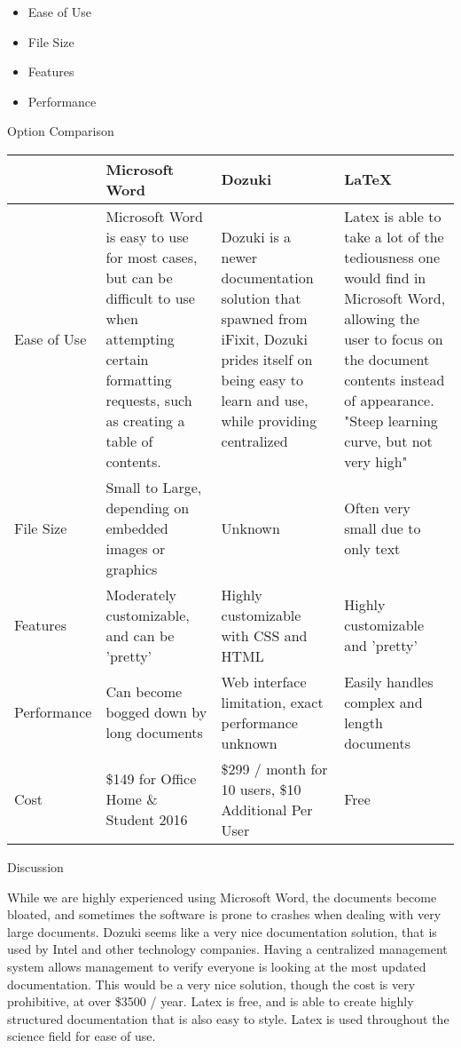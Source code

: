 \documentclass[letterpaper, 10pt, draftclsnofoot, compsoc, onecolumn]{IEEEtran}
\begin{document}
{{\begin{itemize}
\item Ease of Use
\item File Size
\item Features
\item Performance
\end{itemize}

 \par}


\newpage
{\noindent Option Comparison \par}
\tablehead{}
\begin{supertabular}{|p{2cm}|p{4cm}|p{4cm}|p{4cm}|}
\hline  & Microsoft Word & Dozuki & LaTeX\\ \hline
Ease of Use & Microsoft Word is easy to use for most cases, but can be difficult to use when attempting certain formatting requests, such as creating a table of contents. & Dozuki is a newer documentation solution that spawned from iFixit, Dozuki prides itself on being easy to learn and use, while providing centralized   & Latex is able to take a lot of the tediousness one would find in Microsoft Word, allowing the user to focus on the document contents instead of appearance. "Steep learning curve, but not very high" \cite{McGrath} \\ \hline
File Size & Small to Large, depending on embedded images or graphics & Unknown & Often very small due to only text \\ \hline
Features & Moderately customizable, and can be 'pretty' & Highly customizable with CSS and HTML & Highly customizable and 'pretty' \\ \hline
Performance & Can become bogged down by long documents & Web interface limitation, exact performance unknown & Easily handles complex and length documents  \\ \hline
Cost & \$149 for Office Home \& Student 2016 & \$299 / month for 10 users, \$10 Additional Per User & Free \\ \hline

\end{supertabular}

\newpage
{\noindent Discussion \par}
{\noindent While we are highly experienced using Microsoft Word, the documents become bloated, and sometimes the software is prone to crashes when dealing with very large documents. Dozuki seems like a very nice documentation solution, that is used by Intel and other technology companies. Having a centralized management system allows management to verify everyone is looking at the most updated documentation. This would be a very nice solution, though the cost is very prohibitive, at over \$3500 / year. Latex is free, and is able to create highly structured documentation that is also easy to style. Latex is used throughout the science field for ease of use.\par}

}
\end{document}

